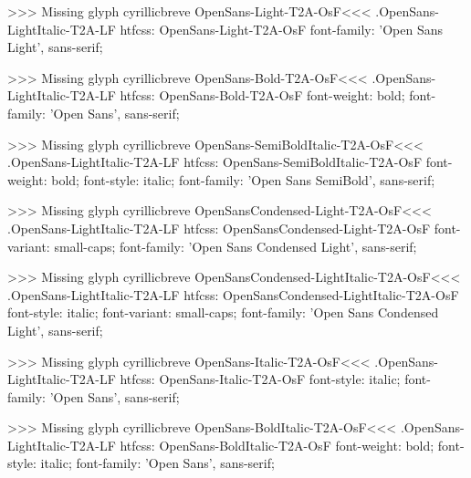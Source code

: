 >>>
Missing glyph	cyrillicbreve
\<OpenSans-Light-T2A-OsF\><<<
.OpenSans-LightItalic-T2A-LF
htfcss:  OpenSans-Light-T2A-OsF  font-family: 'Open Sans Light', sans-serif;

>>>
Missing glyph	cyrillicbreve
\<OpenSans-Bold-T2A-OsF\><<<
.OpenSans-LightItalic-T2A-LF
htfcss:  OpenSans-Bold-T2A-OsF  font-weight: bold; font-family: 'Open Sans', sans-serif;

>>>
Missing glyph	cyrillicbreve
\<OpenSans-SemiBoldItalic-T2A-OsF\><<<
.OpenSans-LightItalic-T2A-LF
htfcss:  OpenSans-SemiBoldItalic-T2A-OsF  font-weight: bold; font-style: italic; font-family: 'Open Sans SemiBold', sans-serif;

>>>
Missing glyph	cyrillicbreve
\<OpenSansCondensed-Light-T2A-OsF\><<<
.OpenSans-LightItalic-T2A-LF
htfcss:  OpenSansCondensed-Light-T2A-OsF  font-variant: small-caps; font-family: 'Open Sans Condensed Light', sans-serif;

>>>
Missing glyph	cyrillicbreve
\<OpenSansCondensed-LightItalic-T2A-OsF\><<<
.OpenSans-LightItalic-T2A-LF
htfcss:  OpenSansCondensed-LightItalic-T2A-OsF  font-style: italic; font-variant: small-caps; font-family: 'Open Sans Condensed Light', sans-serif;

>>>
Missing glyph	cyrillicbreve
\<OpenSans-Italic-T2A-OsF\><<<
.OpenSans-LightItalic-T2A-LF
htfcss:  OpenSans-Italic-T2A-OsF  font-style: italic; font-family: 'Open Sans', sans-serif;

>>>
Missing glyph	cyrillicbreve
\<OpenSans-BoldItalic-T2A-OsF\><<<
.OpenSans-LightItalic-T2A-LF
htfcss:  OpenSans-BoldItalic-T2A-OsF  font-weight: bold; font-style: italic; font-family: 'Open Sans', sans-serif;

